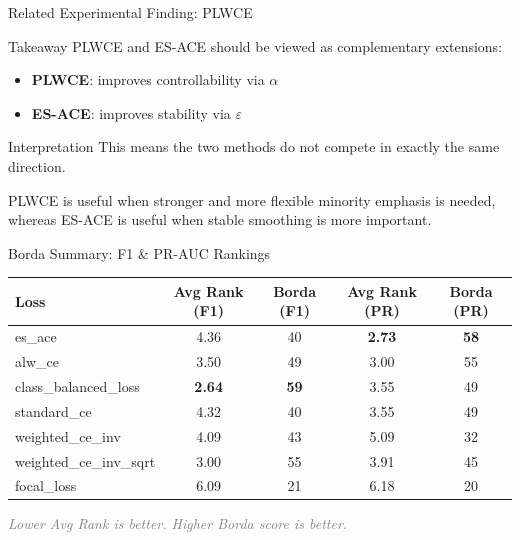 \documentclass[aspectratio=169]{beamer}
\renewcommand{\textbf}[1]{\textcolor{SejongBlue}{\sf\bfseries #1}}
\begin{document}
\begin{frame}{Related Experimental Finding: PLWCE}

\vspace{-0.4em} %

\begin{mybox}[before skip=0pt, after skip=0pt, top=2pt, bottom=2pt]{Takeaway} %
\small
PLWCE and ES-ACE should be viewed as complementary extensions:
\begin{itemize}
  \item \textbf{PLWCE}: improves controllability via $\alpha$
  \item \textbf{ES-ACE}: improves stability via $\varepsilon$
\end{itemize}
\end{mybox}

\vspace{2em} %

\begin{mybox}[before skip=0pt, after skip=0pt, top=2pt, bottom=2pt]{Interpretation} %
\small
This means the two methods do not compete in exactly the same direction.

\vspace{0.4em}

PLWCE is useful when stronger and more flexible minority emphasis is needed,
whereas ES-ACE is useful when stable smoothing is more important.
\end{mybox}

\end{frame}

\begin{frame}{Borda Summary: F1 \& PR-AUC Rankings}

\centering
\small
\renewcommand{\arraystretch}{1.15}

\begin{tabular}{lcccc}
\toprule
\textbf{Loss} &
\textbf{Avg Rank (F1)} & \textbf{Borda (F1)} &
\textbf{Avg Rank (PR)} & \textbf{Borda (PR)} \\
\midrule
es\_ace               & 4.36 & 40 & \textbf{2.73} & \textbf{58} \\
alw\_ce          & 3.50 & 49 & 3.00 & 55 \\
class\_balanced\_loss   & \textbf{2.64} & \textbf{59} & 3.55 & 49 \\
standard\_ce          & 4.32 & 40 & 3.55 & 49 \\
weighted\_ce\_inv     & 4.09 & 43 & 5.09 & 32 \\
weighted\_ce\_inv\_sqrt & 3.00 & 55 & 3.91 & 45 \\
focal\_loss           & 6.09 & 21 & 6.18 & 20 \\
\bottomrule
\end{tabular}

\vspace{0.7em}

{\footnotesize
\textcolor{gray}{\textit{Lower Avg Rank is better. Higher Borda score is better.}}
}

\end{frame}
\end{document}
